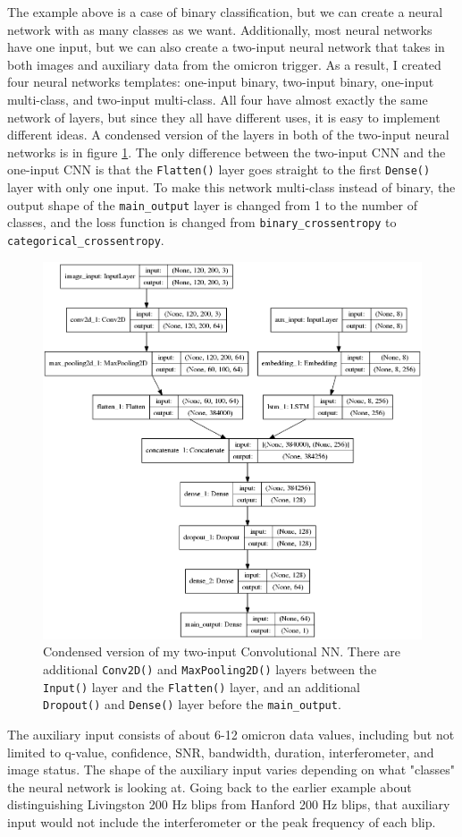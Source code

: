 \documentclass[a4paper]{article}
\begin{document}
The example above is a case of binary classification, but we can create a neural network with as many classes as we want. Additionally, most neural networks have one input, but we can also create a two-input neural network that takes in both images and auxiliary data from the omicron trigger. As a result, I created four neural networks templates: one-input binary, two-input binary, one-input multi-class, and two-input multi-class. All four have almost exactly the same network of layers, but since they all have different uses, it is easy to implement different ideas. A condensed version of the layers in both of the two-input neural networks is in figure \ref{fig:sup_condensed}. The only difference between the two-input CNN and the one-input CNN is that the \texttt{Flatten()} layer goes straight to the first \texttt{Dense()} layer with only one input. To make this network multi-class instead of binary, the output shape of the \texttt{main\_output} layer is changed from 1 to the number of classes, and the loss function is changed from \texttt{binary\_crossentropy} to \texttt{categorical\_crossentropy}.

\begin{figure}[h!]
	\centering
	\includegraphics[width=.5\linewidth]{sup_condensed}
	\caption{Condensed version of my two-input Convolutional NN. There are additional \texttt{Conv2D()} and \texttt{MaxPooling2D()} layers between the \texttt{Input()} layer and the \texttt{Flatten()} layer, and an additional \texttt{Dropout()} and \texttt{Dense()} layer before the \texttt{main\_output}.}
	\label{fig:sup_condensed}
\end{figure}

The auxiliary input consists of about 6-12 omicron data values, including but not limited to q-value, confidence, SNR, bandwidth, duration, interferometer, and image status. The shape of the auxiliary input varies depending on what "classes" the neural network is looking at. Going back to the earlier example about distinguishing Livingston 200 Hz blips from Hanford 200 Hz blips, that auxiliary input would not include the interferometer or the peak frequency of each blip. 
\end{document}
